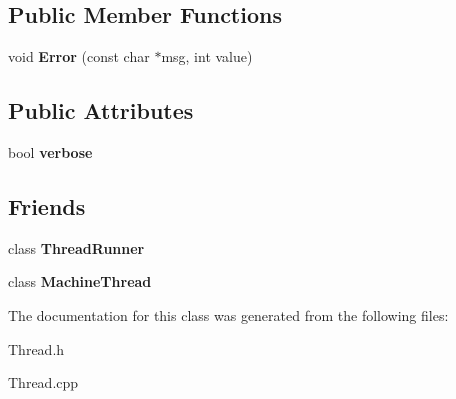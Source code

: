 \subsection*{Public Member Functions}
\begin{DoxyCompactItemize}
\item 
\hypertarget{classfirestep_1_1_monitor_thread_aeec0a226aa0a63a649b9c0ee83a9f185}{void {\bfseries Error} (const char $\ast$msg, int value)}\label{classfirestep_1_1_monitor_thread_aeec0a226aa0a63a649b9c0ee83a9f185}

\end{DoxyCompactItemize}
\subsection*{Public Attributes}
\begin{DoxyCompactItemize}
\item 
\hypertarget{classfirestep_1_1_monitor_thread_a7c6ab8de3d6a340f3937a8b7f14103ee}{bool {\bfseries verbose}}\label{classfirestep_1_1_monitor_thread_a7c6ab8de3d6a340f3937a8b7f14103ee}

\end{DoxyCompactItemize}
\subsection*{Friends}
\begin{DoxyCompactItemize}
\item 
\hypertarget{classfirestep_1_1_monitor_thread_ae32f2b9b26ebd4cd05a23ee82797622d}{class {\bfseries Thread\+Runner}}\label{classfirestep_1_1_monitor_thread_ae32f2b9b26ebd4cd05a23ee82797622d}

\item 
\hypertarget{classfirestep_1_1_monitor_thread_aef06a3028e2da14682b40e8349d0c8c0}{class {\bfseries Machine\+Thread}}\label{classfirestep_1_1_monitor_thread_aef06a3028e2da14682b40e8349d0c8c0}

\end{DoxyCompactItemize}


The documentation for this class was generated from the following files\+:\begin{DoxyCompactItemize}
\item 
Thread.\+h\item 
Thread.\+cpp\end{DoxyCompactItemize}
